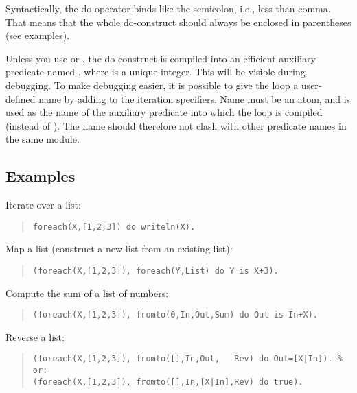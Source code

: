 Syntactically, the do-operator binds like the semicolon, i.e., less than comma.
That means that the whole do-construct should always be enclosed in
parentheses (see examples).

Unless you use  or ,
the do-construct is
compiled into an efficient auxiliary predicate named , where
 is a unique integer. This will be visible during debugging.
To make debugging easier, it is possible to give the loop a
user-defined name by adding %
to the iteration specifiers.  Name must be an atom, and is used as the
name of the auxiliary predicate into which the loop is compiled
(instead of ).  The name should therefore not clash with other
predicate names in the same module.



\subsection{Examples}

Iterate over a list:
\begin{quote}
\begin{verbatim}
foreach(X,[1,2,3]) do writeln(X).
\end{verbatim}
\end{quote}

Map a list (construct a new list from an existing list):
\begin{quote}
\begin{verbatim}
(foreach(X,[1,2,3]), foreach(Y,List) do Y is X+3).
\end{verbatim}
\end{quote}

Compute the sum of a list of numbers:
\begin{quote}
\begin{verbatim}
(foreach(X,[1,2,3]), fromto(0,In,Out,Sum) do Out is In+X).
\end{verbatim}
\end{quote}

Reverse a list:
\begin{quote}
\begin{verbatim}
(foreach(X,[1,2,3]), fromto([],In,Out,   Rev) do Out=[X|In]). % or:
(foreach(X,[1,2,3]), fromto([],In,[X|In],Rev) do true).
\end{verbatim}
\end{quote}

